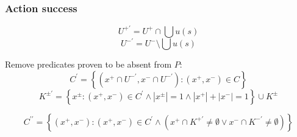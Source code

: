 \documentclass[../master.tex]{subfiles}
\begin{document}
\subsubsection*{Action success}

\[
U^{+\prime}=U^{+}\cap\bigcup u\left(s\right)
\]
\[
U^{-\prime}=U^{-}\setminus\bigcup u\left(s\right)
\]


Remove predicates proven to be absent from $P$:
\[
C^{\prime}=\left\{ \left(x^{+}\cap U^{-\prime},x^{-}\cap U^{-\prime}\right):\left(x^{+},x^{-}\right)\in C\right\}
\]
\[
K^{\pm\prime}=\left\{ x^{\pm}:\left(x^{+},x^{-}\right)\in C^{\prime}\land\left|x^{\pm}\right|=1\land\left|x^{+}\right|+\left|x^{-}\right|=1\right\} \cup K^{\pm}
\]


\[
C^{\prime\prime}=\left\{ \left(x^{+},x^{-}\right):\left(x^{+},x^{-}\right)\in C^{\prime}\land\left(x^{+}\cap K^{+\prime}\neq\emptyset\lor x^{-}\cap K^{-\prime}\neq\emptyset\right)\right\}
\]
\end{document}
